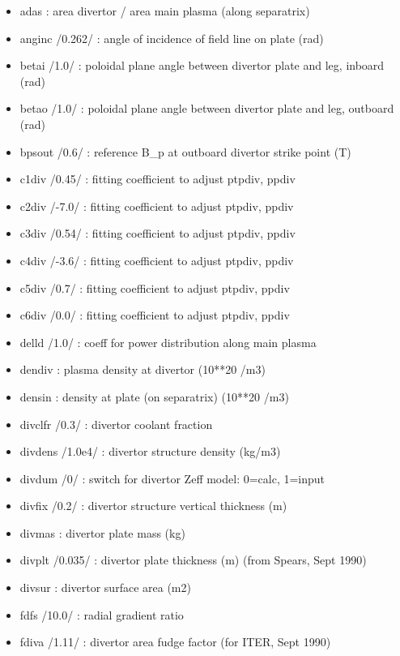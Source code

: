 \documentclass[
]{article}
\providecommand{\tightlist}{%
  \setlength{\itemsep}{0pt}\setlength{\parskip}{0pt}}
\begin{document}
\begin{itemize}
  \begin{itemize}
  \tightlist
  \item
    adas : area divertor / area main plasma (along separatrix)
  \item
    anginc /0.262/ : angle of incidence of field line on plate (rad)
  \item
    betai /1.0/ : poloidal plane angle between divertor plate and leg,
    inboard (rad)
  \item
    betao /1.0/ : poloidal plane angle between divertor plate and leg,
    outboard (rad)
  \item
    bpsout /0.6/ : reference B\_p at outboard divertor strike point (T)
  \item
    c1div /0.45/ : fitting coefficient to adjust ptpdiv, ppdiv
  \item
    c2div /-7.0/ : fitting coefficient to adjust ptpdiv, ppdiv
  \item
    c3div /0.54/ : fitting coefficient to adjust ptpdiv, ppdiv
  \item
    c4div /-3.6/ : fitting coefficient to adjust ptpdiv, ppdiv
  \item
    c5div /0.7/ : fitting coefficient to adjust ptpdiv, ppdiv
  \item
    c6div /0.0/ : fitting coefficient to adjust ptpdiv, ppdiv
  \item
    delld /1.0/ : coeff for power distribution along main plasma
  \item
    dendiv : plasma density at divertor (10**20 /m3)
  \item
    densin : density at plate (on separatrix) (10**20 /m3)
  \item
    divclfr /0.3/ : divertor coolant fraction
  \item
    divdens /1.0e4/ : divertor structure density (kg/m3)
  \item
    divdum /0/ : switch for divertor Zeff model: 0=calc, 1=input
  \item
    divfix /0.2/ : divertor structure vertical thickness (m)
  \item
    divmas : divertor plate mass (kg)
  \item
    divplt /0.035/ : divertor plate thickness (m) (from Spears, Sept
    1990)
  \item
    divsur : divertor surface area (m2)
  \item
    fdfs /10.0/ : radial gradient ratio
  \item
    fdiva /1.11/ : divertor area fudge factor (for ITER, Sept 1990)

\end{itemize}
\end{itemize}
\end{document}
